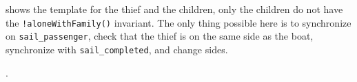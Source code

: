 \noindent {} shows the template for the thief and the children, only the children do not have the \texttt{!aloneWithFamily()} invariant. The only thing possible here is to synchronize on \texttt{sail_passenger}, check that the thief is on the same side as the boat, synchronize with \texttt{sail_completed}, and change sides.

.